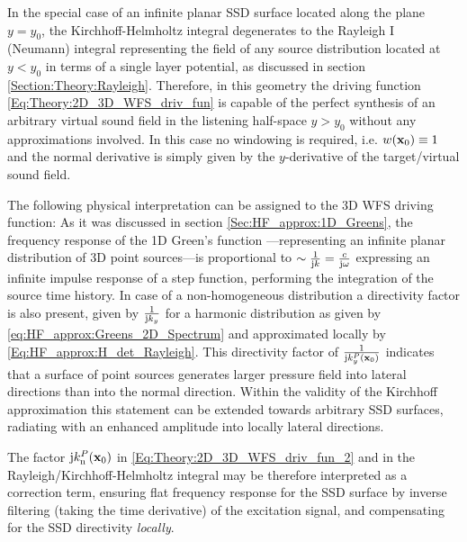 In the special case of an infinite planar SSD surface located along the plane $y = y_0$, the Kirchhoff-Helmholtz integral degenerates to the Rayleigh I (Neumann) integral representing the field of any source distribution located at $y<y_0$ in terms of a single layer potential, as discussed in section \ref{Section:Theory:Rayleigh}.
Therefore, in this geometry the driving function \eqref{Eq:Theory:2D_3D_WFS_driv_fun} is capable of the perfect synthesis of an arbitrary virtual sound field in the listening half-space $y>y_0$ without any approximations involved.
In this case no windowing is required, i.e. $w(\mathbf{x}_0) \equiv 1$ and the normal derivative is simply given by the $y$-derivative of the target/virtual sound field.

\vspace{3mm}
The following physical interpretation can be assigned to the 3D WFS driving function:
As it was discussed in section \ref{Sec:HF_approx:1D_Greens}, the frequency response of the 1D Green's function ---representing an infinite planar distribution of 3D point sources---is proportional to $\sim \frac{1}{\mathrm{j} k} = \frac{c}{\mathrm{j} \omega}$ expressing an infinite impulse response of a step function, performing the integration of the source time history. 
In case of a non-homogeneous distribution a directivity factor is also present, given by $\frac{1}{\mathrm{j} k_y}$ for a harmonic distribution as given by \eqref{eq:HF_approx:Greens_2D_Spectrum} and approximated locally by \eqref{Eq:HF_approx:H_det_Rayleigh}.
This directivity factor of $\frac{1}{\mathrm{j} k^P_y(\mathbf{x}_0)}$ indicates that a surface of point sources generates larger pressure field into lateral directions than into the normal direction.
Within the validity of the Kirchhoff approximation this statement can be extended towards arbitrary SSD surfaces, radiating with an enhanced amplitude into locally lateral directions.

The factor $\mathrm{j} k_{\mathrm{n}}^P(\mathbf{x}_0)$ in \eqref{Eq:Theory:2D_3D_WFS_driv_fun_2} and in the Rayleigh/Kirchhoff-Helmholtz integral may be therefore interpreted as a correction term, ensuring flat frequency response for the SSD surface by inverse filtering (taking the time derivative) of the excitation signal, and compensating for the SSD directivity \emph{locally}.

